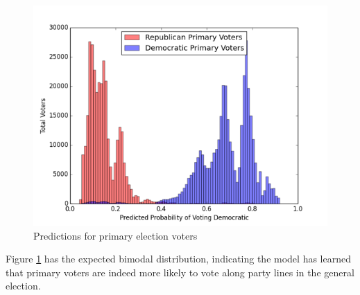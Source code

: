 \documentclass[10pt, letterpaper]{article}
\begin{document}
\begin{multicols}{2}
\begin{figure}[H]
\begin{center}
\includegraphics[scale=0.3]{primaryVoters19}
\end{center}
\caption{Predictions for primary election voters}
\label{fig:primaryVoters19}
\end{figure}

Figure \ref{fig:primaryVoters19} has the expected bimodal distribution, indicating the model has learned that primary voters are indeed more likely to vote along party lines in the general election.


\end{multicols}
\end{document}
